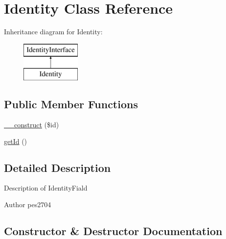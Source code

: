\hypertarget{class_pes_1_1_entity_1_1_persistable_1_1_identity}{}\section{Identity Class Reference}
\label{class_pes_1_1_entity_1_1_persistable_1_1_identity}
Inheritance diagram for Identity\+:\begin{figure}[H]
\begin{center}
\leavevmode
\includegraphics[height=2.000000cm]{class_pes_1_1_entity_1_1_persistable_1_1_identity}
\end{center}
\end{figure}
\subsection*{Public Member Functions}
\begin{DoxyCompactItemize}
\item 
\mbox{\hyperlink{class_pes_1_1_entity_1_1_persistable_1_1_identity_a1340871f436b81e1f225567b6cce4e79}{\+\_\+\+\_\+construct}} (\$id)
\item 
\mbox{\hyperlink{class_pes_1_1_entity_1_1_persistable_1_1_identity_a12251d0c022e9e21c137a105ff683f13}{get\+Id}} ()
\end{DoxyCompactItemize}


\subsection{Detailed Description}
Description of Identity\+Fiald

\begin{DoxyAuthor}{Author}
pes2704 
\end{DoxyAuthor}


\subsection{Constructor \& Destructor Documentation}
\mbox{\label{class_pes_1_1_entity_1_1_persistable_1_1_identity_a1340871f436b81e1f225567b6cce4e79}} 
